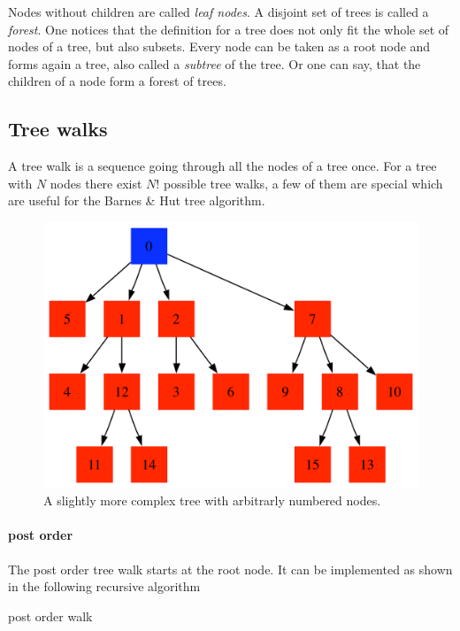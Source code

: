 Nodes without children are called \emph{leaf nodes}. A disjoint set of trees is called a \emph{forest}. One notices that the definition for a tree does not only fit the whole set of nodes of a tree, but also subsets. Every node can be taken as a root node and forms again a tree, also called a \emph{subtree} of the tree. Or one can say, that the children of a node form a forest of trees.

\subsection{Tree walks}
A tree walk is a sequence going through all the nodes of a tree once. For a tree with $N$ nodes there exist $N!$ possible tree walks, a few of them are special which are useful for the Barnes \& Hut tree algorithm.

\begin{figure}[htbp]
\begin{center}
\includegraphics[scale=0.4]{simple_numbered_tree.pdf}
\caption{A slightly more complex tree with arbitrarly numbered nodes.}
\label{fig:simplenumtree}
\end{center}
\end{figure}

\paragraph{post order}
The post order tree walk starts at the root node. It can be implemented as shown in the following recursive algorithm
\begin{algorithm}
\caption{post order walk}
\begin{algorithmic}
\label{alg:postorder}
\ENDFOR
\end{algorithmic}
\end{algorithm}
\\

